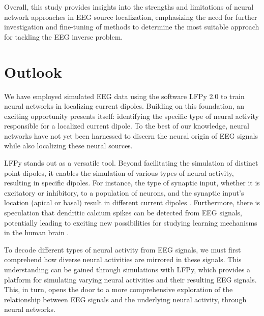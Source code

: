 \documentclass[a4paper, UKenglish, 11pt]{uiomaster}
\begin{document}
Overall, this study provides insights into the strengths and limitations of neural network approaches in EEG source localization, emphasizing the need for further investigation and fine-tuning of methods to determine the most suitable approach for tackling the EEG inverse problem.


\section{Outlook} \label{sec:outlook}
We have employed simulated EEG data using the software LFPy 2.0 to train neural networks in localizing current dipoles. Building on this foundation, an exciting opportunity presents itself: identifying the specific type of neural activity responsible for a localized current dipole. To the best of our knowledge, neural networks have not yet been harnessed to discern the neural origin of EEG signals while also localizing these neural sources.

LFPy stands out as a versatile tool. Beyond facilitating the simulation of distinct point dipoles, it enables the simulation of various types of neural activity, resulting in specific dipoles. For instance, the type of synaptic input, whether it is excitatory or inhibitory, to a population of neurons, and the synaptic input's location (apical or basal) result in different current dipoles \cite{LFPy}.  Furthermore, there is speculation that dendritic calcium spikes can be detected from EEG signals, potentially leading to exciting new possibilities for studying learning mechanisms in the human brain \cite{suzuki2017dendritic}.

To decode different types of neural activity from EEG signals, we must first comprehend how diverse neural activities are mirrored in these signals. This understanding can be gained through simulations with LFPy, which provides a platform for simulating varying neural activities and their resulting EEG signals. This, in turn, opens the door to a more comprehensive exploration of the relationship between EEG signals and the underlying neural activity, through neural networks.









\end{document}

